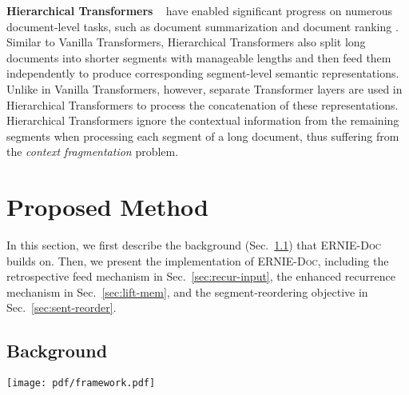 \documentclass[11pt,a4paper]{article}
\newcommand{\mname}{\textsc{ERNIE-Doc}\xspace}
\begin{document}
\noindent\textbf{Hierarchical Transformers} ~\citep{zhang2019hibert, lin2020pretrained} have enabled significant progress on numerous document-level tasks, such as document summarization \citep{zhang2019hibert} and document ranking \citep{lin2020pretrained}. Similar to Vanilla Transformers, Hierarchical Transformers also split long documents into shorter segments with manageable lengths and then feed them independently to produce corresponding segment-level semantic representations. Unlike in Vanilla Transformers, however, separate Transformer layers are used in Hierarchical Transformers to process the concatenation of these representations. Hierarchical Transformers ignore the contextual information from the remaining segments when processing each segment of a long document, thus suffering from the \textit{context fragmentation} problem.
 
\section{Proposed Method}
In this section, we first describe the background (Sec.~\ref{sec:background}) that \mname builds on. Then, we present the implementation of \mname, including the retrospective feed mechanism in Sec.~\ref{sec:recur-input}, the enhanced recurrence mechanism in Sec.~\ref{sec:lift-mem}, and the segment-reordering objective in Sec.~\ref{sec:sent-reorder}.

\subsection{Background}\label{sec:background}

\begin{figure*}[h]
\centering
\texttt{[image: pdf/framework.pdf]}
\caption{Illustrations of \mname and Recurrence Transformers, where models with three layers take as input a long document  which is sliced into four segments . \textbf{Recurrence Transformers (upper-right)}: When training on , it can only fuse the contextual information of the previous two consecutive segments , since the largest effective context length grows linearly w.r.t the number of layers. \textbf{\mname (lower)}:The effective context length is much larger aided by the enhanced recurrence mechanism (Sec.~\ref{sec:lift-mem}). Thus,  can fuse the information of  discarded by Recurrence Transformers. Moreover, segments in the retrospective phase contains the contextual information of an entire document, powered by the retrospective feed mechanism (Sec.~\ref{sec:recur-input}).}
\label{fig:framework}
\vspace{-0.5cm}
\end{figure*}
\end{document}
